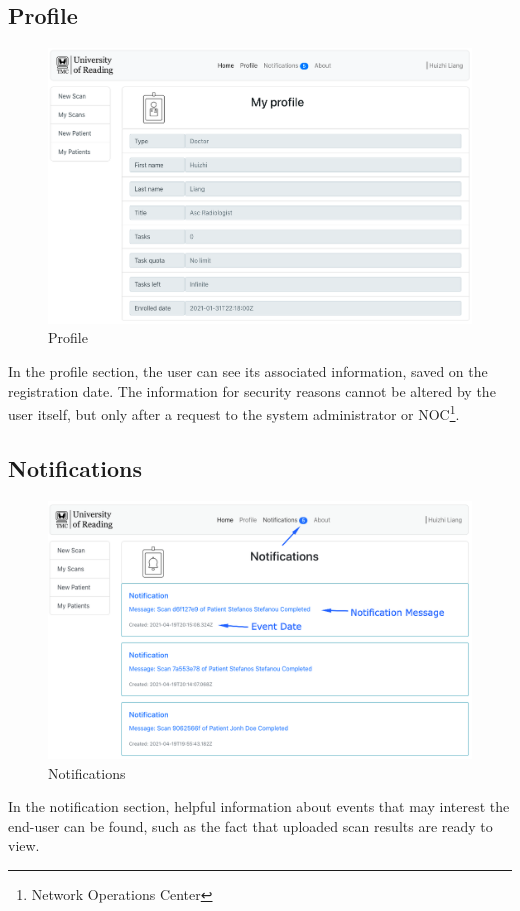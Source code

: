		\subsection{Profile}
			\begin{figure}[H]
				\iftrue
				\centering
				\caption{Profile}
				\includegraphics[scale=0.3]{figures/profile}
				\fi
			\end{figure}
			In the profile section, the user can see its associated information, saved on the registration date. 
			The information for security reasons cannot be altered by the user itself, but only after a request to 
			the system administrator or NOC\footnote{Network Operations Center}.
		\subsection{Notifications}
			\begin{figure}[H]
				\iftrue
				\centering
				\caption{Notifications}
				\includegraphics[scale=0.3]{figures/notifications}
				\fi
			\end{figure}
			In the notification section, helpful information about events that may interest the end-user can be found, 
			such as the fact that uploaded scan results are ready to view. 
